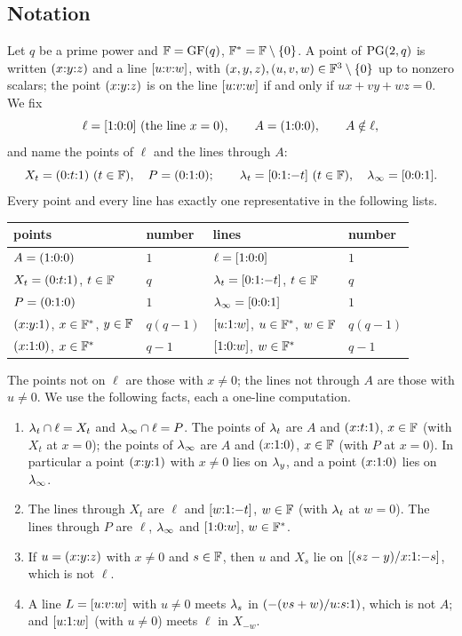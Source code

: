 \subsection{Notation}\label{ssec:notation}
Let $q$ be a prime power and $\mathbb{F} = \mathrm{GF}(q)$, $\mathbb{F}^* = \mathbb{F} \setminus \{0\}$. A point of $\mathrm{PG}(2,q)$ is written $({x}{:}{y}{:}{z})$ and a line $[{u}{:}{v}{:}{w}]$, with $(x,y,z), (u,v,w) \in \mathbb{F}^3 \setminus \{0\}$ up to nonzero scalars; the point $({x}{:}{y}{:}{z})$ is on the line $[{u}{:}{v}{:}{w}]$ if and only if $ux + vy + wz = 0$. We fix
\[
\ell = [{1}{:}{0}{:}{0}] \ (\text{the line } x = 0), \qquad A = ({1}{:}{0}{:}{0}), \qquad A \notin \ell,
\]
and name the points of $\ell$ and the lines through $A$:
\[
X_t = ({0}{:}{t}{:}{1}) \ (t \in \mathbb{F}), \quad P = ({0}{:}{1}{:}{0}); \qquad
\lambda_t = [{0}{:}{1}{:}{-t}] \ (t \in \mathbb{F}), \quad \lambda_\infty = [{0}{:}{0}{:}{1}] .
\]
Every point and every line has exactly one representative in the following lists.
\begin{center}
\begin{tabular}{@{}ll@{\qquad}ll@{}}
\toprule
points & number & lines & number\\
\midrule
$A = ({1}{:}{0}{:}{0})$ & $1$ & $\ell = [{1}{:}{0}{:}{0}]$ & $1$ \\
$X_t = ({0}{:}{t}{:}{1})$, $t \in \mathbb{F}$ & $q$ & $\lambda_t = [{0}{:}{1}{:}{-t}]$, $t \in \mathbb{F}$ & $q$ \\
$P = ({0}{:}{1}{:}{0})$ & $1$ & $\lambda_\infty = [{0}{:}{0}{:}{1}]$ & $1$ \\
$({x}{:}{y}{:}{1})$, $x \in \mathbb{F}^*$, $y \in \mathbb{F}$ & $q(q-1)$ & $[{u}{:}{1}{:}{w}]$, $u \in \mathbb{F}^*$, $w \in \mathbb{F}$ & $q(q-1)$\\
$({x}{:}{1}{:}{0})$, $x \in \mathbb{F}^*$ & $q-1$ & $[{1}{:}{0}{:}{w}]$, $w \in \mathbb{F}^*$ & $q-1$ \\
\bottomrule
\end{tabular}
\end{center}
The points not on $\ell$ are those with $x \ne 0$; the lines not through $A$ are those with $u \neq 0$. We use the following facts, each a one-line computation.
\begin{enumerate}[label=\textup{(F\arabic*)},leftmargin=3em]
\item\label{f:lam} $\lambda_t \cap \ell = X_t$ and $\lambda_\infty \cap \ell = P$. The points of $\lambda_t$ are $A$ and $({x}{:}{t}{:}{1})$, $x \in \mathbb{F}$ (with $X_t$ at $x = 0$); the points of $\lambda_\infty$ are $A$ and $({x}{:}{1}{:}{0})$, $x \in \mathbb{F}$ (with $P$ at $x = 0$). In particular a point $({x}{:}{y}{:}{1})$ with $x \ne 0$ lies on $\lambda_y$, and a point $({x}{:}{1}{:}{0})$ lies on $\lambda_\infty$.
\item\label{f:X} The lines through $X_t$ are $\ell$ and $[{w}{:}{1}{:}{-t}]$, $w \in \mathbb{F}$ (with $\lambda_t$ at $w = 0$). The lines through $P$ are $\ell$, $\lambda_\infty$ and $[{1}{:}{0}{:}{w}]$, $w \in \mathbb{F}^*$.
\item\label{f:join} If $u = ({x}{:}{y}{:}{z})$ with $x \neq 0$ and $s \in \mathbb{F}$, then $u$ and $X_s$ lie on $[{(sz-y)/x}{:}{1}{:}{-s}]$, which is not $\ell$.
\item\label{f:meet} A line $L = [{u}{:}{v}{:}{w}]$ with $u \neq 0$ meets $\lambda_s$ in $({-(vs+w)/u}{:}{s}{:}{1})$, which is not $A$; and $[{u}{:}{1}{:}{w}]$ (with $u \ne 0$) meets $\ell$ in $X_{-w}$.
\end{enumerate}


